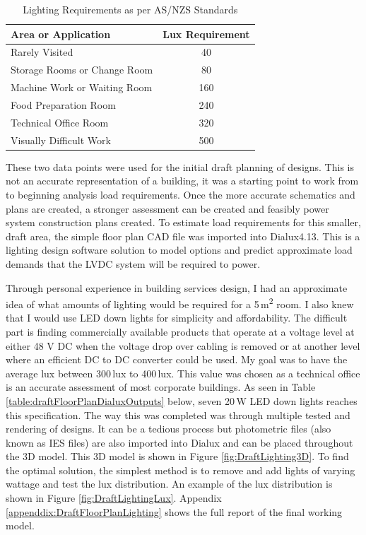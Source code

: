\begin{table}[H]
	\centering
	\renewcommand{\arraystretch}{2}
	\begin{tabular}{|l|c|}
		\hline
		\textbf{Area or Application} 	& \textbf{Lux Requirement} \\ \hline
		Rarely Visited 					& 40 \\ \hline
		Storage Rooms or Change Room 	& 80 \\ \hline
		Machine Work or Waiting Room 	& 160 \\ \hline
		Food Preparation Room 			& 240 \\ \hline
		Technical Office Room 			& 320 \\ \hline
		Visually Difficult Work 		& 500 \\ \hline
	\end{tabular}
	\caption{Lighting Requirements as per AS/NZS Standards \cite{StandardsAustralia2006_2}}
	\label{table:LightingRequirements}
\end{table}

These two data points were used for the initial draft planning of designs. This is not an accurate representation of a building, it was a starting point to work from to beginning analysis load requirements. Once the more accurate schematics and plans are created, a stronger assessment can be created and feasibly power system construction plans created. To estimate load requirements for this smaller, draft area, the simple floor plan CAD file was imported into Dialux4.13. This is a lighting design software solution to model options and predict approximate load demands that the LVDC system will be required to power.  
\newline

Through personal experience in building services design, I had an approximate idea of what amounts of lighting would be required for a 5\,\si{m^2} room. I also knew that I would use LED down lights for simplicity and affordability. The difficult part is finding commercially available products that operate at a voltage level at either 48 V DC when the voltage drop over cabling is removed or at another level where an efficient DC to DC converter could be used. My goal was to have the average lux between 300\,\si{lux} to 400\,\si{lux}. This value was chosen as a technical office is an accurate assessment of most corporate buildings. As seen in Table \ref{table:draftFloorPlanDialuxOutputs} below, seven 20\,\si{W} LED down lights reaches this specification. The way this was completed was through multiple tested and rendering of designs. It can be a tedious process but photometric files (also known as IES files) are also imported into Dialux and can be placed throughout the 3D model. This 3D model is shown in Figure \ref{fig:DraftLighting3D}. To find the optimal solution, the simplest method is to remove and add lights of varying wattage and test the lux distribution. An example of the lux distribution is shown in Figure \ref{fig:DraftLightingLux}. Appendix \ref{appenddix:DraftFloorPlanLighting} shows the full report of the final working model.   

